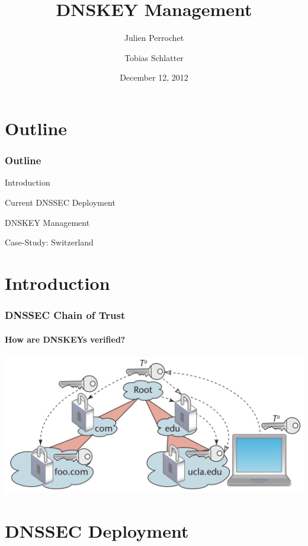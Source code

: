 \documentclass{beamer}
\title{DNSKEY Management}
\author{Julien Perrochet \and Tobias Schlatter}
\date{December 12, 2012}
\institute{ITSEC, EPFL, Prof. Janson}
\begin{document}
\begin{frame}
  \titlepage
\end{frame}

\section{Outline}
\begin{frame}
  \frametitle{Outline}

  \begin{block}{Introduction}
  \end{block}

  \begin{block}{Current DNSSEC Deployment}
  \end{block}

  \begin{block}{DNSKEY Management}
  \end{block}

  \begin{block}{Case-Study: Switzerland}
  \end{block}

\end{frame}

\section{Introduction}
\begin{frame}
  \frametitle{DNSSEC Chain of Trust}
  \framesubtitle{How are DNSKEYs verified?}

  \includegraphics[width=\textwidth]{trust-chain}

\end{frame}



\section{DNSSEC Deployment}
\end{document}
